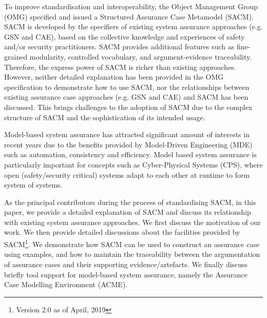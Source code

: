 To improve standardisation and interoperability, the Object Management Group (OMG) specified and issued a Structured Assurance Case Metamodel (SACM). 
SACM is developed by the specifiers of existing system assurance approaches (e.g. GSN and CAE), based on the collective knowledge and experiences of safety and/or security practitioners.
SACM provides additional features such as fine-grained modularity, controlled vocabulary, and argument-evidence traceability. 
Therefore, the express power of SACM is richer than existing approaches. 
However, neither detailed explanation has been provided in the OMG specification to demonstrate how to use SACM, nor the relationships between existing assurance case approaches (e.g. GSN and CAE) and SACM has been discussed. 
This brings challenges to the adoption of SACM due to the complex structure of SACM and the sophistication of its intended usage. 

Model-based system assurance has attracted significant amount of interests in recent years due to the benefits provided by Model-Driven Engineering (MDE) such as automation, consistency and efficiency. 
Model based system assurance is particularly important for concepts such as Cyber-Physical Systems (CPS), where open (safety/security critical) systems adapt to each other at runtime to form system of systems. 


As the principal contributors during the process of standardising SACM, in this paper, we provide a detailed explanation of SACM and discuss its relationship with existing system assurance approaches. 
We first discuss the motivation of our work. 
We then provide detailed discussions about the facilities provided by SACM\footnote{Version 2.0 as of April, 2019}. 
We demonstrate how SACM can be used to construct an assurance case using examples, and how to maintain the traceability between the argumentation of assurance cases and their supporting evidence/artefacts. 
We finally discuss briefly tool support for model-based system assurance, namely the Assurance Case Modelling Environment (ACME).

